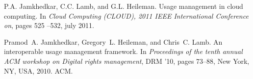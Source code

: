 \documentclass[margin,line]{resume}
\begin{document}
\begin{resume}
P.A. Jamkhedkar, C.C. Lamb, and G.L. Heileman.
\newblock Usage management in cloud computing.
\newblock In {\em Cloud Computing (CLOUD), 2011 IEEE International Conference
  on}, pages 525 --532, july 2011.

Pramod~A. Jamkhedkar, Gregory~L. Heileman, and Chris~C. Lamb.
\newblock An interoperable usage management framework.
\newblock In {\em Proceedings of the tenth annual ACM workshop on Digital
  rights management}, DRM '10, pages 73--88, New York, NY, USA, 2010. ACM.

\end{resume}
\end{document}
